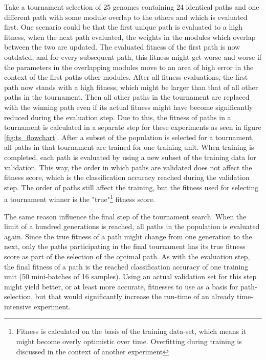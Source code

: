 Take a tournament selection of 25 genomes containing 24 identical paths and one different path with some module overlap to the others and which is evaluated first. One scenario could be that the first unique path is evaluated to a high fitness, when the next path evaluated, the weights in the modules which overlap between the two are updated. The evaluated fitness of the first path is now outdated, and for every subsequent path, this fitness might get worse and worse if the parameters in the overlapping modules move to an area of high error in the context of the first paths other modules. After all fitness evaluations, the first path now stands with a high fitness, which might be larger than that of all other paths in the tournament. Then all other paths in the tournament are replaced with the winning path even if its actual fitness might have become significantly reduced during the evaluation step. Due to this, the fitness of paths in a tournament is calculated in a separate step for these experiments as seen in figure \ref{fig:ts_flowchart}. After a subset of the population is selected for a tournament, all paths in that tournament are trained for one training unit. When training is completed, each path is evaluated by using a new subset of the training data for validation. This way, the order in which paths are validated does not affect the fitness score, which is the classification accuracy reached during the validation step. The order of paths still affect the training, but the fitness used for selecting a tournament winner is the "true"\footnote{Fitness is calculated on the basis of the training data-set, which means it might become overly optimistic over time. Overfitting during training is discussed in the context of another experiment} fitness score.

The same reason influence the final step of the tournament search. When the limit of a hundred generations is reached, all paths in the population is evaluated again. Since the true fitness of a path might change from one generation to the next, only the paths participating in the final tournament has its true fitness score as part of the selection of the optimal path. As with the evaluation step, the final fitness of a path is the reached classification accuracy of one training unit (50 mini-batches of 16 samples). Using an actual validation set for this step might yield better, or at least more accurate, fitnesses to use as a basis for path-selection, but that would significantly increase the run-time of an already time-intensive experiment. 


